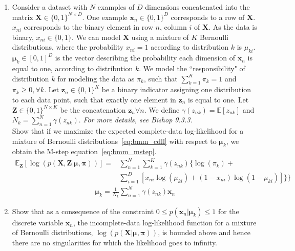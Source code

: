 \documentclass[11pt]{article}
\begin{document}
\begin{enumerate}[label=(\alph*)]
    \item Consider a dataset with $N$ examples of $D$ dimensions concatenated into the matrix $\mathbf{X} \in \{0,1\}^{N \times D}$. One example $\mathbf{x}_n \in \{0,1\}^D$ corresponds to a row of $\mathbf{X}$. $x_{ni}$ corresponds to the binary element in row $n$, column $i$ of $\mathbf{X}$. As the data is binary, $x_{ni} \in \{0, 1\}$. We can model $\mathbf{X}$ using a mixture of $K$ Bernoulli distributions, where the probability $x_{ni} = 1$ according to distribution $k$ is $\mu_{ki}$. $\boldsymbol{\mu}_k \in [0,1]^{D}$ is the vector describing the probability each dimension of $\mathbf{x}_n$ is equal to one, according to distribution $k$. We model the ``responsibility" of distribution $k$ for modeling the data as $\pi_{k}$, such that $\sum_{k=1}^K {\pi_k} = 1$ and $\pi_k \ge 0, \forall k$. Let $\mathbf{z}_n \in \{0,1\}^{K}$ be a binary indicator assigning one distribution to each data point, such that exactly one element in $\mathbf{z}_n$ is equal to one. Let $\mathbf{Z} \in \{0,1\}^{N \times K}$ be the concatenation $\mathbf{z}_n \forall n$. We define  $\gamma(z_{nk}) = \mathbb{E}[z_{nk}]$ and $N_k = \sum_{n=1}^N{\gamma(z_{nk})}$. \textit{For more details, see Bishop 9.3.3.}\\
    
    
    Show that if we maximize the expected complete-data log-likelihood for a mixture of Bernoulli distributions~\eqref{eq:bmm_cdll} with respect to $\boldsymbol{\mu}_k$, we obtain the M-step equation~\eqref{eq:bmm_mstep}.
\begin{align}\label{eq:bmm_cdll}
\mathbb{E}_{\mathbf{Z}} \left[\log(p(\mathbf{X}, \mathbf{Z} \vert \boldsymbol{\mu}, \boldsymbol{\pi}))\right]=&\sum_{n=1}^N \sum_{k=1}^K \gamma(z_{nk}) \big\{ \log(\pi_k) + \nonumber &\\
&\sum_{i=1}^D \left[ x_{ni} \log(\mu_{ki}) + (1 - x_{ni}) \log(1 - \mu_{ki}) \right] \big\} \}
\end{align}
\begin{align}\label{eq:bmm_mstep}
\boldsymbol{\mu}_k = \frac{1}{N_k} \sum_{n=1}^N \gamma(z_{nk}) \mathbf{x}_n
\end{align}

\begin{answertext}{10cm}{}

\end{answertext}

\item Show that as a consequence of the constraint $0 \leq p(\mathbf{x}_n \vert \boldsymbol{\mu}_k) \leq 1$ for the discrete variable $\mathbf{x}_n$, the incomplete-data log-likelihood function for a mixture of Bernoulli distributions, $\log(p(\mathbf{X} \vert \boldsymbol{\mu}, \boldsymbol{\pi}))$, is bounded above and hence there are no singularities for which the likelihood goes to infinity.


\end{enumerate}
\end{document}

